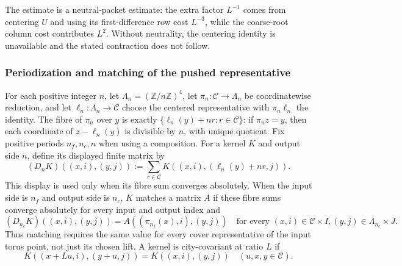 \begin{remark}
The estimate is a neutral-packet estimate: the extra factor $L^{-1}$ comes
from centering $U$ and using its first-difference row cost $L^{-3}$, while the
coarse-root column cost contributes $L^2$. Without neutrality, the centering
identity is unavailable and the stated contraction does not follow.
\end{remark}

\subsubsection{Periodization and matching of the pushed representative}

For each positive integer $n$, let $\Lambda_n=(\mathbb Z/n\mathbb Z)^4$,
let $\pi_n: \mathcal C\to\Lambda_n$ be coordinatewise reduction, and let
$\ell_n: \Lambda_n\to\mathcal C$ choose the centered representative
with $\pi_n\ell_n$ the identity. The fibre of $\pi_n$ over $y$ is exactly
$\{\ell_n(y)+n r:r\in\mathcal C\}$: if $\pi_n z=y$, then each
coordinate of $z-\ell_n(y)$ is divisible by $n$, with unique quotient.
Fix positive periods $n_f,n_c,n$ when using a composition. For a kernel $K$
and output side $n$, define its displayed finite matrix by
\[
 (D_nK)((x,i),(y,j))
 :=\sum_{r\in\mathcal C}K((x,i),(\ell_n(y)+nr,j)).
\]
This display is used only when its fibre sum converges absolutely. When the
input side is $n_f$ and output side is $n_c$, $K$ matches a matrix $A$ if
these fibre sums converge absolutely for every input and output index and
\begin{equation}
 (D_{n_c}K)((x,i),(y,j))=A((\pi_{n_f}(x),i),(y,j))
 \quad\text{for every }(x,i)\in\mathcal C\times I,
                      (y,j)\in\Lambda_{n_c}\times J.
 \label{eq:ex-lattice-flat-step-match}
\end{equation}
Thus matching requires the same value for every cover representative of the
input torus point, not just its chosen lift. A kernel is city-covariant at
ratio $L$ if
\begin{equation}
 K((x+Lu,i),(y+u,j))=K((x,i),(y,j))
 \quad (u,x,y\in\mathcal C).
 \label{eq:ex-lattice-flat-step-city}
\end{equation}

